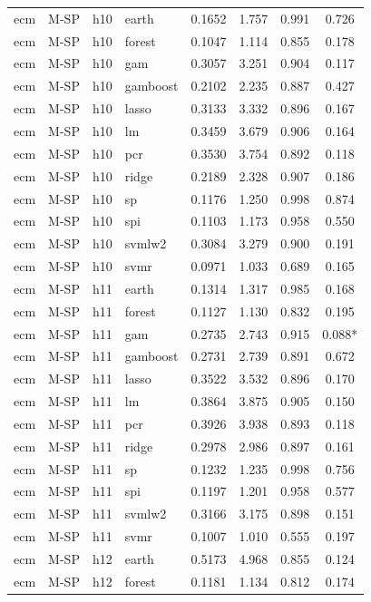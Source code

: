 \begin{ThreePartTable}
\begin{longtable}[t]{llclcccc}
ecm & M-SP & h10 & earth & 0.1652 & 1.757 & 0.991 & 0.726\\
ecm & M-SP & h10 & forest & 0.1047 & 1.114 & 0.855 & 0.178\\
ecm & M-SP & h10 & gam & 0.3057 & 3.251 & 0.904 & 0.117\\
ecm & M-SP & h10 & gamboost & 0.2102 & 2.235 & 0.887 & 0.427\\
ecm & M-SP & h10 & lasso & 0.3133 & 3.332 & 0.896 & 0.167\\
ecm & M-SP & h10 & lm & 0.3459 & 3.679 & 0.906 & 0.164\\
ecm & M-SP & h10 & pcr & 0.3530 & 3.754 & 0.892 & 0.118\\
ecm & M-SP & h10 & ridge & 0.2189 & 2.328 & 0.907 & 0.186\\
ecm & M-SP & h10 & sp & 0.1176 & 1.250 & 0.998 & 0.874\\
ecm & M-SP & h10 & spi & 0.1103 & 1.173 & 0.958 & 0.550\\
ecm & M-SP & h10 & svmlw2 & 0.3084 & 3.279 & 0.900 & 0.191\\
ecm & M-SP & h10 & svmr & 0.0971 & 1.033 & 0.689 & 0.165\\
\addlinespace
ecm & M-SP & h11 & earth & 0.1314 & 1.317 & 0.985 & 0.168\\
ecm & M-SP & h11 & forest & 0.1127 & 1.130 & 0.832 & 0.195\\
ecm & M-SP & h11 & gam & 0.2735 & 2.743 & 0.915 & 0.088*\\
ecm & M-SP & h11 & gamboost & 0.2731 & 2.739 & 0.891 & 0.672\\
ecm & M-SP & h11 & lasso & 0.3522 & 3.532 & 0.896 & 0.170\\
ecm & M-SP & h11 & lm & 0.3864 & 3.875 & 0.905 & 0.150\\
ecm & M-SP & h11 & pcr & 0.3926 & 3.938 & 0.893 & 0.118\\
ecm & M-SP & h11 & ridge & 0.2978 & 2.986 & 0.897 & 0.161\\
ecm & M-SP & h11 & sp & 0.1232 & 1.235 & 0.998 & 0.756\\
ecm & M-SP & h11 & spi & 0.1197 & 1.201 & 0.958 & 0.577\\
ecm & M-SP & h11 & svmlw2 & 0.3166 & 3.175 & 0.898 & 0.151\\
ecm & M-SP & h11 & svmr & 0.1007 & 1.010 & 0.555 & 0.197\\
\addlinespace
ecm & M-SP & h12 & earth & 0.5173 & 4.968 & 0.855 & 0.124\\
ecm & M-SP & h12 & forest & 0.1181 & 1.134 & 0.812 & 0.174\\

\end{longtable}
\end{ThreePartTable}
